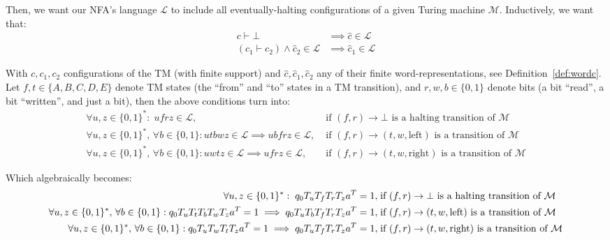 Then, we want our NFA's language $\mathcal{L}$ to include all eventually-halting configurations of a given Turing machine $\mathcal{M}$.  Inductively, we want that:
\begin{align*}
  c\vdash\bot                                    & \implies \hat{c} \in \mathcal{L}  \\
  (c_1\vdash c_2)\land \hat{c}_2 \in \mathcal{L} & \implies\hat{c}_1 \in \mathcal{L}
\end{align*}

With $c, c_1, c_2$ configurations of the TM (with finite support) and $\hat{c}, \hat{c}_1, \hat{c}_2$ any of their finite word-representations, see Definition~\ref{def:wordc}. Let $f,t \in \{A,B,C,D,E\}$ denote TM states (the ``from'' and ``to'' states in a TM transition), and $r,w,b \in \{0,1\}$ denote bits (a bit ``read'', a bit ``written'', and just a bit), then the above conditions turn into:
\begin{align*}
  \forall u,z\in\{0, 1\}^*: \; ufrz \in \mathcal{L},\;                                                           & \text{if $(f,r) \to \bot$ is a halting transition of $\mathcal{M}$}
  \\
  \forall u,z\in\{0, 1\}^*,\,\forall b \in \{0, 1\}: utbwz \in \mathcal{L} \implies ubfrz \in \mathcal{L},\;     & \text{if $(f,r) \to (t,w,\text{left})$ is a transition of $\mathcal{M}$}
  \\
  \forall u,z\in\{0, 1\}^*,\,\forall b \in \{0, 1\}: u w t z \in \mathcal{L} \implies u f r z \in \mathcal{L},\; & \text{if $(f,r) \to (t,w,\text{right})$ is a transition of $\mathcal{M}$}
\end{align*}

Which algebraically becomes:
\begin{align*}
  \forall u,z\in\{0, 1\}^*: \; q_0 T_u T_f T_r T_z a^T = 1, \;                                                                           & \text{if $(f,r) \to \bot$ is a halting transition of $\mathcal{M}$}
  \\
  \forall u,z\in\{0, 1\}^*,\,\forall b \in \{0, 1\}: q_0 T_{u} T_t T_b T_w T_{z} a^T = 1 \implies q_0 T_{u} T_b T_f T_r T_{z} a^T = 1,\; & \text{if $(f,r) \to (t,w,\text{left})$ is a transition of $\mathcal{M}$}
  \\
  \forall u,z\in\{0, 1\}^*,\,\forall b \in \{0, 1\}: q_0 T_{u} T_w T_t T_{z} a^T = 1 \implies q_0 T_{u} T_f T_r T_{z} a^T = 1,\;         & \text{if $(f,r) \to (t,w,\text{right})$ is a transition of $\mathcal{M}$}
\end{align*}

